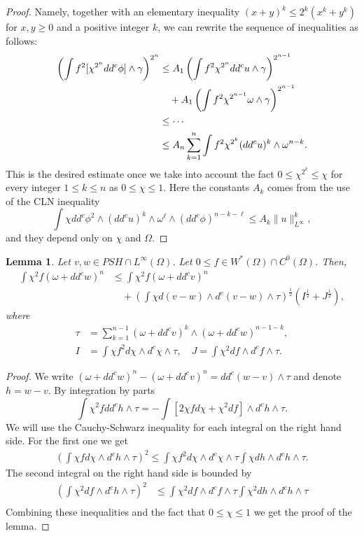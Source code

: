 \documentclass{amsart}
\newcommand{\ga}{\gamma}
\newcommand{\om}{\omega}
\newcommand{\Om}{\Omega}
\newtheorem{lem}[thm]{Lemma}
\theoremstyle{definition}
\numberwithin{thm}{section}
\numberwithin{equation}{section}
\renewcommand{\[}{\begin{equation}}
\renewcommand{\]}{\end{equation}}
\newcommand{\wed}{\wedge}
\begin{document}
\begin{proof}
Namely, together with an elementary inequality $(x+y)^k \leq 2^k (x^k + y^k)$ for $x,y\geq 0$ and a positive integer $k$, we can rewrite the sequence of inequalities as follows:
\[\notag\begin{aligned}
	\left(\int f^2 [\chi^{2^n} dd^c\phi] \wed \ga\right)^{2^n} 
&\leq A_1 \left( \int f^2 \chi^{2^{n}} dd^c u  \wed \ga \right)^{2^{n-1}}  \\
&\quad + A_1 \left( \int f^2 \chi^{2^{n-1}} \om \wed \ga \right)^{2^{n-1}} \\
&\leq \cdots  \\
&\leq A_n  \sum_{k=1}^n  \int f^2 \chi^{2^{k}} (dd^cu)^k \wed \om^{n-k}. 
\end{aligned}\]
This is the desired estimate once we take into account the fact  $0 \leq \chi^{2^k} \leq \chi$ for every integer $1\leq k\leq n$ as $0\leq \chi \leq 1$.
Here the constants $A_k$ comes from the use of the CLN inequality
$$
	\int \chi dd^c\phi^2 \wed (dd^c u)^k \wed \om^{\ell} \wed (dd^c\phi)^{n-k-\ell} \leq A_k \|u\|_{L^\infty}^k,
$$
and they depend only on $\chi$ and $\Om$.
\end{proof}

\begin{lem} \label{lem:L1-cap-comparison} Let $v, w \in PSH \cap L^\infty (\Om)$. Let $0\leq f\in W^*(\Om) \cap C^0(\Om)$. Then,
$$\begin{aligned}
	\int \chi^2 f (\om+ dd^c w)^n &\leq \int \chi^2 f  (\om+ dd^c v)^n \\ 
&\quad +\left( \int \chi d(v-w)\wed d^c (v-w) \wed \tau \right)^\frac{1}{2}  (I^\frac{1}{2} + J^\frac{1}{2}) ,
\end{aligned}$$
where 
$$
\begin{aligned}
\tau &= \sum_{k=1}^{n-1} (\om+ dd^cv)^k \wed (\om+ dd^cw)^{n-1-k},\\
 I &= \int \chi f^2 d\chi \wed d^c \chi \wed \tau,\quad 
J = \int \chi^2 df \wed d^cf \wed \tau.
\end{aligned}$$ 
\end{lem}

\begin{proof} We write $(\om+ dd^cw)^n - (\om+ dd^c v)^n =dd^c(w-v)\wed \tau$ and 
denote $h=w-v$. By integration by parts
$$
	\int \chi^2 f dd^c h \wed \tau = - \int [2\chi f d\chi + \chi^2  df] \wed d^c h \wed \tau.
$$
We will use the Cauchy-Schwarz inequality for each integral on the right hand side. For the first one we get
$$\begin{aligned}
	\left( \int \chi fd\chi \wed d^c h \wed \tau \right)^2 \leq \int \chi f^2 d\chi \wed d^c \chi \wed \tau  \int \chi  dh\wed d^c h \wed \tau.
\end{aligned}$$
The second integral on the right hand side is bounded by
$$\begin{aligned}
\left( \int \chi^2  df \wed d^c h \wed \tau \right)^2 
&\leq \int \chi^2 df\wed d^c f \wed \tau \int \chi^2  dh \wed d^c h\wed \tau\\
\end{aligned}$$
Combining these inequalities and the fact that $0\leq \chi \leq 1$ we get the proof of the lemma.
\end{proof}
\end{document}
